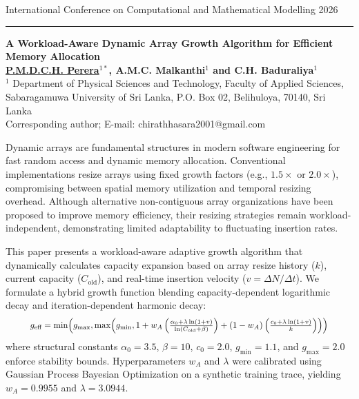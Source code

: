 \documentclass[twoside, 10pt, a4paper]{article}
\begin{document}
\vspace{44pt}
\begin{center}
\begin{flushleft}
\footnotesize International Conference on Computational and Mathematical Modelling 2026
\end{flushleft}
\vspace{10pt}
\hrule
\vspace{15pt}
{ \bf{\large A Workload-Aware Dynamic Array Growth Algorithm for Efficient Memory Allocation}}\\
\vspace{10pt}
{\bf \small \underline{P.M.D.C.H. Perera}$^{1*}$,  \bf A.M.C. Malkanthi$^{1}$ and
C.H. Baduraliya$^{1}$}\\
$^{1}$ \small Department of Physical Sciences and Technology, Faculty of Applied Sciences, Sabaragamuwa University of Sri Lanka, P.O. Box 02, Belihuloya, 70140, Sri Lanka\\
\small *Corresponding author; E-mail: chirathhasara2001@gmail.com\\
\end{center}

\vspace{12pt}

Dynamic arrays are fundamental structures in modern software engineering for fast random access and dynamic memory allocation. Conventional implementations resize arrays using fixed growth factors (e.g., $1.5\times$ or $2.0\times$), compromising between spatial memory utilization and temporal resizing overhead. Although alternative non-contiguous array organizations have been proposed to improve memory efficiency, their resizing strategies remain workload-independent, demonstrating limited adaptability to fluctuating insertion rates.

This paper presents a workload-aware adaptive growth algorithm that dynamically calculates capacity expansion based on array resize history ($k$), current capacity ($C_{\text{old}}$), and real-time insertion velocity ($v = \Delta N / \Delta t$). We formulate a hybrid growth function blending capacity-dependent logarithmic decay and iteration-dependent harmonic decay:
\[
\scalebox{0.90}{$g_{\text{eff}} = \min\!\left( g_{\max}, \max\!\left( g_{\min}, 1 + w_A \left( \frac{\alpha_0 + \lambda \ln(1+v)}{\ln(C_{\text{old}} + \beta)} \right) + (1 - w_A) \left( \frac{c_0 + \lambda \ln(1+v)}{k} \right) \right) \right)$}
\]
where structural constants $\alpha_0 = 3.5$, $\beta = 10$, $c_0 = 2.0$, $g_{\min} = 1.1$, and $g_{\max} = 2.0$ enforce stability bounds. Hyperparameters $w_A$ and $\lambda$ were calibrated using Gaussian Process Bayesian Optimization on a synthetic training trace, yielding $w_A = 0.9955$ and $\lambda = 3.0944$.
\end{document}
